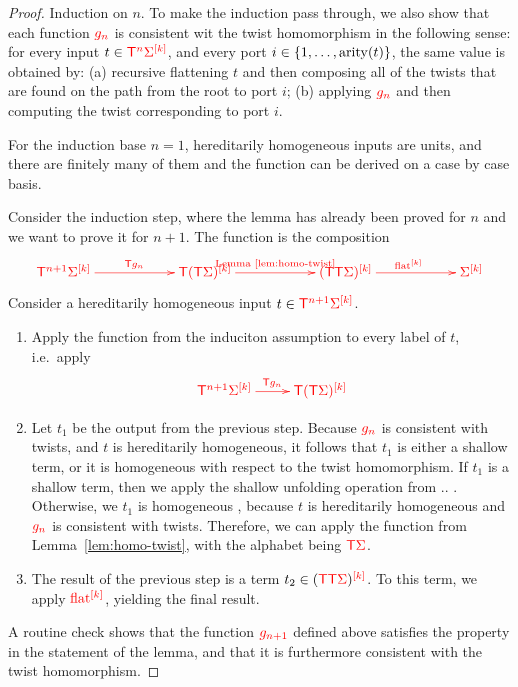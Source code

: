 \begin{proof}
    Induction on $n$. To make the induction pass through, we also show that each function $\ranked{g_n}$ is consistent wit the  twist homomorphism in the following sense: for every input $t \in \tmonadn n \mati k \rSigma$, and every port $i \in \set{1,\ldots,\arity t}$, the same value is obtained by: (a) recursive flattening $t$ and then composing all of the twists that are found on the path from the root to port $i$; (b) applying $\ranked{g_n}$ and then computing the twist corresponding to port $i$. 
    
    For the induction base $n=1$, hereditarily homogeneous inputs are units, and there are finitely many of them and the function can be derived on a case by case basis. 
    
    Consider the induction step, where the lemma has already been proved for $n$ and we want to prove it for $n+1$. The function is the composition
    \begin{align*}
        \ranked{
            \xymatrix@C=2cm{
                \tmonadn {n+1} \mati k \Sigma \ar[r]^{\tmonad g_n} & \tmonad \mati k{(\tmonad \Sigma)} \ar[r]^{\text{Lemma~\ref{lem:homo-twist}}}&  \mati k  {(\tmonad \tmonad \rSigma)} \ar[r]^{\mati k \flatt} & \mati k \rSigma
            }
        }
    \end{align*}
    Consider a  hereditarily homogeneous input $t   \in \ranked{\tmonadn{n+1} \mati k \Sigma}$. 
    \begin{enumerate}
            \item Apply the function from the induciton assumption to every label of $t$, i.e.~apply 
        \begin{align*}
        \ranked{
            \xymatrix{
                \tmonadn {n+1} \mati k \Sigma \ar[r]^{\tmonad g_n} & \tmonad \mati k{(\tmonad \Sigma)}
            }
        }
        \end{align*}
        \item Let $t_1$ be the output from the previous step. Because $\ranked {g_n}$ is consistent with twists, and $t$ is hereditarily homogeneous, it follows that $t_1$  is either a shallow term, or it is homogeneous with respect to the twist homomorphism.  If $t_1$ is a shallow term, then we apply the shallow unfolding operation from .. . Otherwise, we $t_1$ is homogeneous
        , because $t$ is hereditarily homogeneous and $\ranked{g_n}$ is consistent with twists. Therefore, we can apply the function
        from Lemma~\ref{lem:homo-twist}, with the alphabet being $\tmonad \rSigma$. 
        \item The result of the previous step is a term $t_2 \in \mati k {(\tmonad \tmonad \rSigma)}$. To this term, we apply $\mati k \flatt$, yielding the final result.
    \end{enumerate}
    A routine check shows that the function $\ranked{g_{n+1}}$ defined above satisfies the property in the statement of the lemma, and that it is furthermore consistent with the twist homomorphism.     
\end{proof}